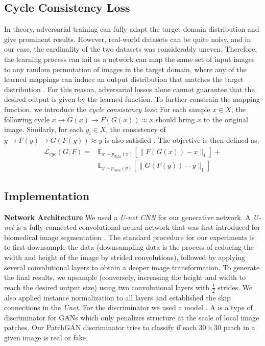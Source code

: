 \documentclass[10pt,twocolumn,letterpaper]{article}
\begin{document}
\subsection{Cycle Consistency Loss}
In theory, adversarial training can fully adapt the target domain distribution and give prominent results. However, real-world datasets can be quite noisy, and in our case, the cardinality of the two datasets was considerably uneven. Therefore, the learning process can fail as a network can map the same set of input images to any random permutation of images in the target domain, where any of the learned mappings can induce an output distribution that matches the target distribution \cite{cyclegan}. For this reason, adversarial losses alone cannot guarantee that the desired output is given by the learned function. To further constrain the mapping function, we introduce the \emph{cycle consistency loss}: For each sample $x \in X$, the following cycle $x \rightarrow G(x)\rightarrow F(G(x)) \approx x$ should bring $x$ to the original image. Similarly, for each $y_{i}\in X$, the consistency of $y \rightarrow F(y)\rightarrow G(F(y)) \approx y$ is also satisfied \cite{cyclegan}. The objective is then defined as:
\begin{equation}
	\begin{split}
		\mathcal{L}_{cyc}(G,F) = & \mathbb{E}_{x \sim p_{data}(x)} [\| F(G(x))-x \| _1] + \\
				& \mathbb{E}_{y \sim p_{data}(y)} [\| G(F(y))-y \| _1]
	\end{split}
\end{equation}


\subsection{Implementation}
\textbf{Network Architecture} We used a \textit{U-net CNN} for our generative network. A \textit{U-net} is a fully connected convolutional neural network that was first introduced for biomedical image segmentation \cite{unet}. The standard procedure for our experiments is to first downsample the data (downsampling data is the process of reducing the width and height of the image by strided convolutions), followed by applying several convolutional layers to obtain a deeper image transformation. To generate the final results, we upsample (conversely, increasing the height and width to reach the desired output size) using two convolutional layers with $\frac{1}{2}$ strides. We also applied instance normalization \cite{insnorm} to all layers and established the skip connections in the \textit{Unet}. For the discriminator we used a  model \cite{patchgan}. A  is a type of discriminator for GANs which only penalizes structure at the scale of local image patches. Our PatchGAN discriminator tries to classify if each $30 \times 30$ patch in a given image is real or fake.
\end{document}
